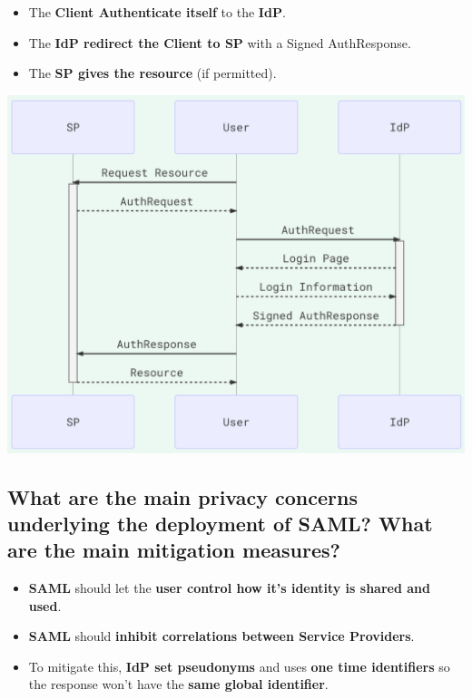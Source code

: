 \documentclass[9pt, letterpaper]{article}
\begin{document}
\begin{itemize}
\begin{itemize}
		\item The \textbf{Client Authenticate itself} to the \textbf{IdP}.
		\item The \textbf{IdP redirect the Client to SP} with a Signed AuthResponse.
		\item The \textbf{SP gives the resource} (if permitted).
	\end{itemize}
	\begin{center}
		\includegraphics[scale=0.6]{SSO_SP.png}
	\end{center}
\end{itemize}

\subsection{What are the main privacy concerns underlying the deployment of SAML? What are the main mitigation measures?}
\begin{itemize}
	\item \textbf{SAML} should let the \textbf{user control how it's identity is shared and used}.
	\item \textbf{SAML} should \textbf{inhibit correlations between Service Providers}.
	\item To mitigate this, \textbf{IdP set pseudonyms} and uses \textbf{one time identifiers} so the response won't have the \textbf{same global identifier}.
\end{itemize}

\newpage
\end{document}
